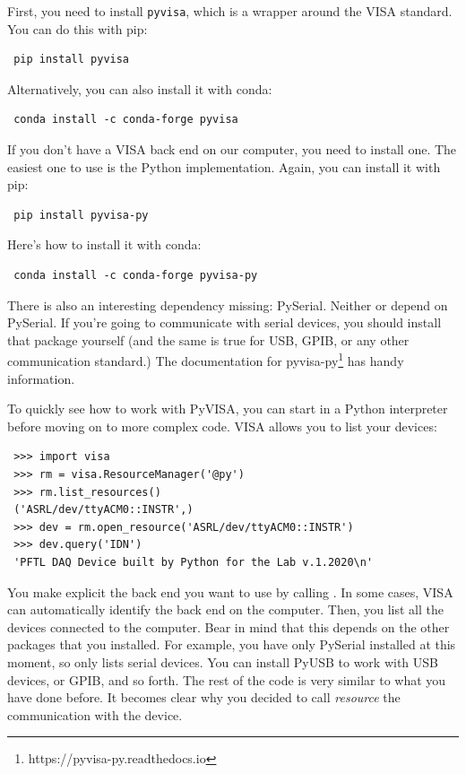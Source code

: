 First, you need to install \texttt{pyvisa}, which is a wrapper around the VISA standard. You can do this with pip:

\begin{verbatim}
 pip install pyvisa
\end{verbatim}

Alternatively, you can also install it with conda:

\begin{verbatim}
 conda install -c conda-forge pyvisa
\end{verbatim}

If you don't have a VISA back end on our computer, you need to install one. The easiest one to use is the Python implementation. Again, you can install it with pip:

\begin{verbatim}
 pip install pyvisa-py
\end{verbatim}

Here's how to install it with conda:

\begin{verbatim}
 conda install -c conda-forge pyvisa-py
\end{verbatim}

There is also an interesting dependency missing: PySerial. Neither  or  depend on PySerial. If you're going to communicate with serial devices, you should install that package yourself (and the same is true for USB, GPIB, or any other communication standard.) The documentation for pyvisa-py\footnote{https://pyvisa-py.readthedocs.io} has handy information.

To quickly see how to work with PyVISA, you can start in a Python interpreter before moving on to more complex code. VISA allows you to list your devices:

\begin{verbatim}
 >>> import visa
 >>> rm = visa.ResourceManager('@py')
 >>> rm.list_resources()
 ('ASRL/dev/ttyACM0::INSTR',)
 >>> dev = rm.open_resource('ASRL/dev/ttyACM0::INSTR')
 >>> dev.query('IDN')
 'PFTL DAQ Device built by Python for the Lab v.1.2020\n'
\end{verbatim}

\sloppy You make explicit the back end you want to use by calling . In some cases, VISA can automatically identify the back end on the computer. Then, you list all the devices connected to the computer. Bear in mind that this depends on the other packages that you installed. For example, you have only PySerial installed at this moment, so  only lists serial devices. You can install PyUSB to work with USB devices, or GPIB, and so forth. The rest of the code is very similar to what you have done before. It becomes clear why you decided to call \emph{resource} the communication with the device.

